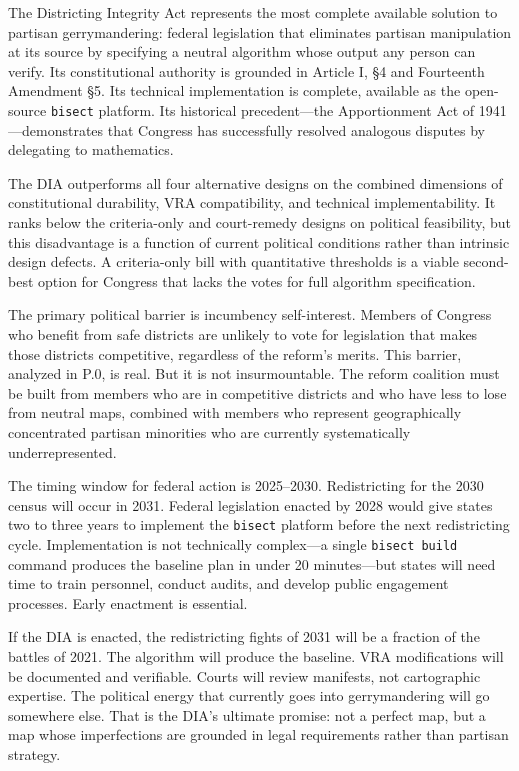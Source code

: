 The Districting Integrity Act represents the most complete available solution to partisan gerrymandering: federal legislation that eliminates partisan manipulation at its source by specifying a neutral algorithm whose output any person can verify. Its constitutional authority is grounded in Article I, \S4 and Fourteenth Amendment \S5. Its technical implementation is complete, available as the open-source \texttt{bisect} platform. Its historical precedent---the Apportionment Act of 1941---demonstrates that Congress has successfully resolved analogous disputes by delegating to mathematics.

The DIA outperforms all four alternative designs on the combined dimensions of constitutional durability, VRA compatibility, and technical implementability. It ranks below the criteria-only and court-remedy designs on political feasibility, but this disadvantage is a function of current political conditions rather than intrinsic design defects. A criteria-only bill with quantitative thresholds is a viable second-best option for Congress that lacks the votes for full algorithm specification.

The primary political barrier is incumbency self-interest. Members of Congress who benefit from safe districts are unlikely to vote for legislation that makes those districts competitive, regardless of the reform's merits. This barrier, analyzed in P.0, is real. But it is not insurmountable. The reform coalition must be built from members who are in competitive districts and who have less to lose from neutral maps, combined with members who represent geographically concentrated partisan minorities who are currently systematically underrepresented.

The timing window for federal action is 2025--2030. Redistricting for the 2030 census will occur in 2031. Federal legislation enacted by 2028 would give states two to three years to implement the \texttt{bisect} platform before the next redistricting cycle. Implementation is not technically complex---a single \texttt{bisect build} command produces the baseline plan in under 20 minutes---but states will need time to train personnel, conduct audits, and develop public engagement processes. Early enactment is essential.

If the DIA is enacted, the redistricting fights of 2031 will be a fraction of the battles of 2021. The algorithm will produce the baseline. VRA modifications will be documented and verifiable. Courts will review manifests, not cartographic expertise. The political energy that currently goes into gerrymandering will go somewhere else. That is the DIA's ultimate promise: not a perfect map, but a map whose imperfections are grounded in legal requirements rather than partisan strategy.
